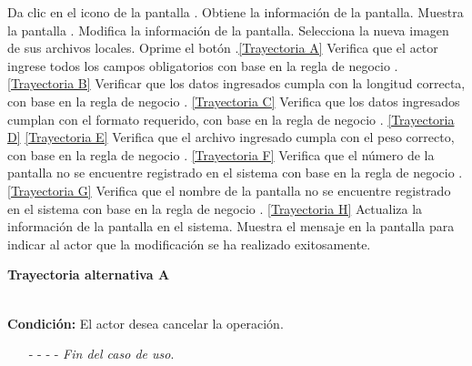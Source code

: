 	\begin{UCtrayectoria}
		\UCpaso[\UCactor] Da clic en el icono \editar de la pantalla .
		\UCpaso[\UCsist] Obtiene la información de la pantalla.
		\UCpaso[\UCsist] Muestra la pantalla . \label{CU11.2-P7}
		\UCpaso[\UCactor] Modifica la información de la pantalla. \label{CU11.2-P5}
		\UCpaso[\UCactor] Selecciona la nueva imagen de sus archivos locales. \label{CU11.2-P6}
		\UCpaso[\UCactor] Oprime el botón .\hyperlink{CU11-2:TAA}{[Trayectoria A]} 
		\UCpaso[\UCsist] Verifica que el actor ingrese todos los campos obligatorios con base en la regla de negocio . \hyperlink{CU11-2:TAB}{[Trayectoria B]}
		\UCpaso[\UCsist] Verificar que los datos ingresados cumpla con la longitud correcta, con base en la regla de negocio . \hyperlink{CU11-2:TAC}{[Trayectoria C]}
		\UCpaso[\UCsist] Verifica que los datos ingresados cumplan con el formato requerido, con base en la regla de negocio . \hyperlink{CU11-2:TAD}{[Trayectoria D]} \hyperlink{CU11-2:TAE}{[Trayectoria E]}
		\UCpaso[\UCsist] Verifica que el archivo ingresado cumpla con el peso correcto, con base en la regla de negocio . \hyperlink{CU11-2:TAF}{[Trayectoria F]}
		\UCpaso[\UCsist] Verifica que el número de la pantalla no se encuentre registrado en el sistema con base en la regla de negocio . \hyperlink{CU11-2:TAG}{[Trayectoria G]}
		\UCpaso[\UCsist] Verifica que el nombre de la pantalla no se encuentre registrado en el sistema con base en la regla de negocio . \hyperlink{CU11-2:TAH}{[Trayectoria H]} 
		\UCpaso[\UCsist] Actualiza la información de la pantalla en el sistema.
		\UCpaso[\UCsist] Muestra el mensaje  en la pantalla  para indicar al actor que la modificación se ha realizado exitosamente.
	\end{UCtrayectoria}		
\hypertarget{CU11-2:TAA}{\textbf{Trayectoria alternativa A}}\\
\noindent \textbf{Condición:} El actor desea cancelar la operación.
\begin{enumerate}
	\UCpaso[\UCactor] Solicita cancelar la operación oprimiendo el botón  de la pantalla .
	\UCpaso[\UCsist] Muestra la pantalla .
	\item[- -] - - {\em {Fin del caso de uso}}.%
\end{enumerate}
